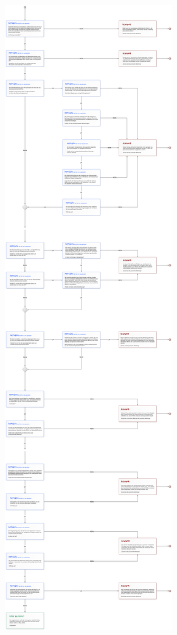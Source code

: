 \documentclass[a4paper,pointlessnumbers]{scrreprt}
\begin{document}
\begin{center}
\includegraphics[width=\textwidth]{images/flussdiagramm01.pdf}

\end{center}
\end{document}
